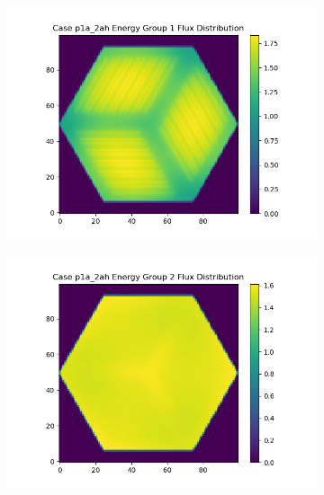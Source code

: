 \documentclass[letterpaper,11pt]{report}
\begin{document}
\begin{figure}[H]
      \begin{subfigure}{.33\textwidth}
        \centering
        \includegraphics[width=1.1\linewidth]{../../phase1a/case2ah/analysis_output/p1a_2ah_e_eg1.png}
        \caption{}
      \end{subfigure}%
      \begin{subfigure}{.33\textwidth}
        \centering
        \includegraphics[width=1.1\linewidth]{../../phase1a/case2ah/analysis_output/p1a_2ah_e_eg2.png}
        \caption{}
      \end{subfigure}
      \begin{subfigure}{.33\textwidth}
        \centering

\end{subfigure}
\end{figure}
\end{document}
